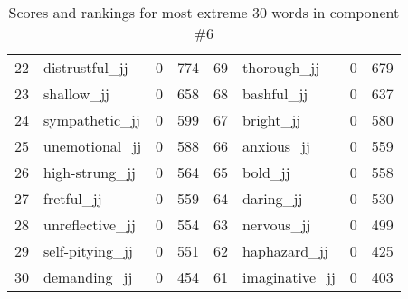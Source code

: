 \begin{table}[tbp]
\begin{tabular}{| rlr@{.}l | rlr@{.}l |}
    22 & distrustful\_jj & 0 & 774    &    69 & thorough\_jj & 0 & 679 \\
    23 & shallow\_jj & 0 & 658    &    68 & bashful\_jj & 0 & 637 \\
    24 & sympathetic\_jj & 0 & 599    &    67 & bright\_jj & 0 & 580 \\
    25 & unemotional\_jj & 0 & 588    &    66 & anxious\_jj & 0 & 559 \\
    26 & high-strung\_jj & 0 & 564    &    65 & bold\_jj & 0 & 558 \\
    27 & fretful\_jj & 0 & 559    &    64 & daring\_jj & 0 & 530 \\
    28 & unreflective\_jj & 0 & 554    &    63 & nervous\_jj & 0 & 499 \\
    29 & self-pitying\_jj & 0 & 551    &    62 & haphazard\_jj & 0 & 425 \\
    30 & demanding\_jj & 0 & 454    &    61 & imaginative\_jj & 0 & 403 \\
    \hline
    \end{tabular}
    \caption{Scores and rankings for most extreme 30 words in component \#6} 
\end{table}
\clearpage

